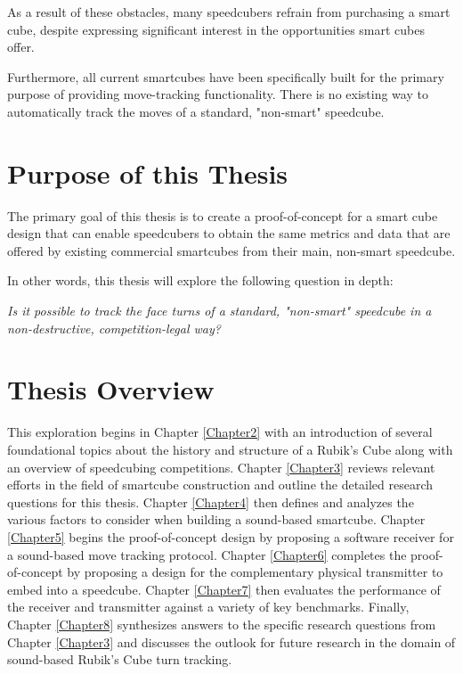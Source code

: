 As a result of these obstacles, many speedcubers refrain from
purchasing a smart cube, despite expressing significant interest in the
opportunities smart cubes offer.

Furthermore, all current smartcubes have been specifically built for
the primary purpose of providing move-tracking functionality. There is
no existing way to automatically track the moves of a standard,
"non-smart" speedcube.


\section{Purpose of this Thesis}
\label{sec:thesis-purpose}

The primary goal of this thesis is to create a proof-of-concept for a
smart cube design that can enable speedcubers to obtain the same
metrics and data that are offered by existing commercial smartcubes
from their main, non-smart speedcube.

In other words, this thesis will explore the following question in depth:

\emph{Is it possible to track the face turns of a standard, "non-smart"
speedcube in a non-destructive, competition-legal way?}


\section{Thesis Overview}
\label{sec:thesis-overview}

This exploration begins in Chapter \ref{Chapter2} with an introduction
of several foundational topics about the history and structure of a
Rubik's Cube along with an overview of speedcubing competitions.
Chapter \ref{Chapter3} reviews relevant efforts in the field of
smartcube construction and outline the detailed research questions for
this thesis. Chapter \ref{Chapter4} then defines and analyzes the
various factors to consider when building a sound-based smartcube.
Chapter \ref{Chapter5} begins the proof-of-concept design by proposing
a software receiver for a sound-based move tracking protocol. Chapter
\ref{Chapter6} completes the proof-of-concept by proposing a design for
the complementary physical transmitter to embed into a speedcube.
Chapter \ref{Chapter7} then evaluates the performance of the receiver
and transmitter against a variety of key benchmarks. Finally, Chapter
\ref{Chapter8} synthesizes answers to the specific research questions
from Chapter \ref{Chapter3} and discusses the outlook for future
research in the domain of sound-based Rubik's Cube turn tracking.
